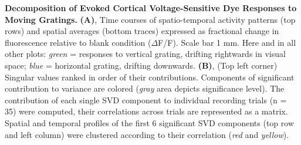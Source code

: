 \textbf{Decomposition of Evoked Cortical Voltage-Sensitive Dye Responses to
Moving Gratings.} \textbf{(A)}, Time courses of spatio-temporal activity
patterns (top rows) and spatial averages (bottom traces) expressed as
fractional change in fluorescence relative to blank condition
($\Delta$F/F). Scale bar 1 mm. Here and in all other plots: \textit{green}
= responses to vertical grating, drifting rightwards in visual space;
\textit{blue} = horizontal grating, drifting downwards.  \textbf{(B)}, (Top
left corner) Singular values ranked in order of their contributions.
Components of significant contribution to variance are colored
(\textit{gray} area depicts significance level). The contribution of each
single SVD component to individual recording trials (n = 35) were computed,
their correlations across trials are represented as a matrix. Spatial and
temporal profiles of the first 6 significant SVD components (top row and
left column) were clustered according to their correlation (\textit{red}
and \textit{yellow}).

